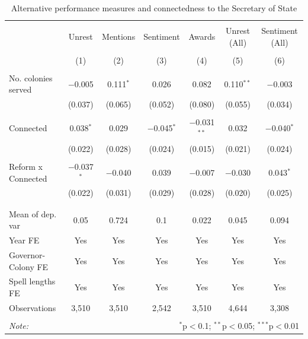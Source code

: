 \documentclass[a4paper]{article}\usepackage[]{graphicx}\usepackage[]{color}
\begin{document}
\begin{table}[!htbp] \centering 
  \caption{Alternative performance measures and connectedness to the Secretary of State} 
  \label{tab:alt} 
\scriptsize 
\begin{tabular}{@{\extracolsep{5pt}}lcccccc} 
\\[-1.8ex]\hline 
\hline \\[-1.8ex] 
 & Unrest & Mentions & Sentiment & Awards & Unrest (All) & Sentiment (All) \\ 
\\[-1.8ex] & (1) & (2) & (3) & (4) & (5) & (6)\\ 
\hline \\[-1.8ex] 
 No. colonies served & $-$0.005 & 0.111$^{*}$ & 0.026 & 0.082 & 0.110$^{**}$ & $-$0.003 \\ 
  & (0.037) & (0.065) & (0.052) & (0.080) & (0.055) & (0.034) \\ 
  & & & & & & \\ 
 Connected & 0.038$^{*}$ & 0.029 & $-$0.045$^{*}$ & $-$0.031$^{**}$ & 0.032 & $-$0.040$^{*}$ \\ 
  & (0.022) & (0.028) & (0.024) & (0.015) & (0.021) & (0.024) \\ 
  & & & & & & \\ 
 Reform x Connected & $-$0.037$^{*}$ & $-$0.040 & 0.039 & $-$0.007 & $-$0.030 & 0.043$^{*}$ \\ 
  & (0.022) & (0.031) & (0.029) & (0.028) & (0.020) & (0.025) \\ 
  & & & & & & \\ 
\hline \\[-1.8ex] 
Mean of dep. var & 0.05 & 0.724 & 0.1 & 0.022 & 0.045 & 0.094 \\ 
Year FE & Yes & Yes & Yes & Yes & Yes & Yes \\ 
Governor-Colony FE & Yes & Yes & Yes & Yes & Yes & Yes \\ 
Spell lengths FE & Yes & Yes & Yes & Yes & Yes & Yes \\ 
Observations & 3,510 & 3,510 & 2,542 & 3,510 & 4,644 & 3,308 \\ 
\hline 
\hline \\[-1.8ex] 
\textit{Note:}  & \multicolumn{6}{r}{$^{*}$p$<$0.1; $^{**}$p$<$0.05; $^{***}$p$<$0.01} \\ 
\end{tabular} 
\end{table} 
\end{document}
